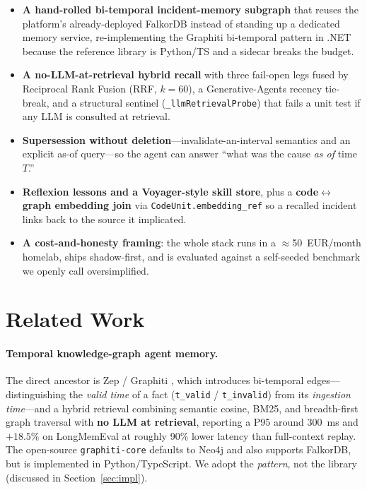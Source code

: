 \documentclass[11pt]{article}
\begin{document}
\begin{itemize}
  \item \textbf{A hand-rolled bi-temporal incident-memory subgraph} that reuses
    the platform's already-deployed FalkorDB instead of standing up a dedicated
    memory service, re-implementing the Graphiti bi-temporal pattern in .NET
    because the reference library is Python/TS and a sidecar breaks the budget.
  \item \textbf{A no-LLM-at-retrieval hybrid recall} with three fail-open legs
    fused by Reciprocal Rank Fusion (RRF, $k=60$), a Generative-Agents recency
    tie-break, and a structural sentinel (\texttt{\_llmRetrievalProbe}) that
    fails a unit test if any LLM is consulted at retrieval.
  \item \textbf{Supersession without deletion}---invalidate-an-interval semantics
    and an explicit as-of query---so the agent can answer ``what was the cause
    \emph{as of} time~$T$.''
  \item \textbf{Reflexion lessons and a Voyager-style skill store}, plus a
    \textbf{code$\leftrightarrow$graph embedding join} via
    \texttt{CodeUnit.embedding\_ref} so a recalled incident links back to the
    source it implicated.
  \item \textbf{A cost-and-honesty framing}: the whole stack runs in a
    $\approx$50~EUR/month homelab, ships shadow-first, and is evaluated against a
    self-seeded benchmark we openly call oversimplified.
\end{itemize}

\section{Related Work}

\paragraph{Temporal knowledge-graph agent memory.}
The direct ancestor is Zep / Graphiti \citep{rasmussen2025zep}, which introduces
bi-temporal edges---distinguishing the \emph{valid time} of a fact
(\texttt{t\_valid} / \texttt{t\_invalid}) from its \emph{ingestion time}---and a
hybrid retrieval combining semantic cosine, BM25, and breadth-first graph
traversal with \textbf{no LLM at retrieval}, reporting a P95 around 300~ms and
$+18.5\%$ on LongMemEval at roughly 90\% lower latency than full-context replay.
The open-source \texttt{graphiti-core} defaults to Neo4j and also supports
FalkorDB, but is implemented in Python/TypeScript. We adopt the \emph{pattern},
not the library (discussed in Section~\ref{sec:impl}).
\end{document}
